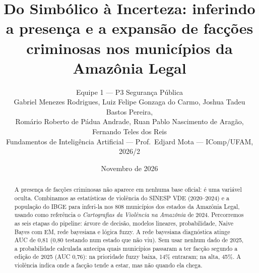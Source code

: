 \documentclass[10pt,a4paper,twocolumn]{article}
\title{\textbf{Do Simbólico à Incerteza: inferindo a presença e a expansão
de facções criminosas nos municípios da Amazônia Legal}}
\author{Equipe 1 --- P3 Segurança Pública\\[2pt]
\small Gabriel Menezes Rodrigues, Luiz Felipe Gonzaga do Carmo, Joshua Tadeu Bastos Pereira,\\
\small Romário Roberto de Pádua Andrade, Ruan Pablo Nascimento de Aragão, Fernando Teles dos Reis\\[2pt]
\small Fundamentos de Inteligência Artificial --- Prof.\ Edjard Mota --- IComp/UFAM, 2026/2}
\date{Novembro de 2026}
\begin{document}
\maketitle
\begin{abstract}
\noindent A presença de facções criminosas não aparece em nenhuma base oficial: é uma
variável oculta. Combinamos as estatísticas de violência do SINESP VDE (2020--2024) e a
população do IBGE para inferi-la nos 808 municípios dos estados da Amazônia Legal, usando
como referência o \emph{Cartografias da Violência na Amazônia} de 2024. Percorremos as
seis etapas do pipeline: árvore de decisão, modelos lineares, probabilidade, Naive Bayes
com EM, rede bayesiana e lógica fuzzy. A rede bayesiana diagnóstica atinge AUC de 0,81
(0,80 testando num estado que não viu). Sem usar nenhum dado de 2025, a probabilidade
calculada antecipa quais municípios passaram a ter facção segundo a edição de 2025
(AUC 0,76): na prioridade fuzzy baixa, 14\% entraram; na alta, 45\%. A violência indica
onde a facção tende a estar, mas não quando ela chega.
\end{abstract}
\end{document}
